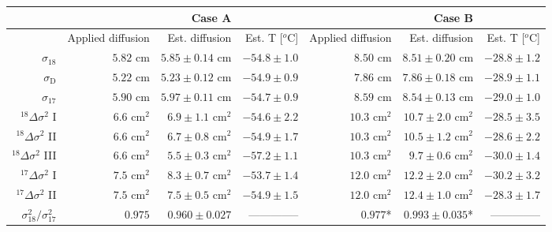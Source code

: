 \documentclass[11pt, draftcls, onecolumn]{IEEEtran} %
\numberwithin{equation}{section}
\numberwithin{table}{section}
\numberwithin{figure}{section}
\begin{document}
\begin{table}[]
	\center
	\begin{tabular}{r r r r r r r } 
		\toprule
		& &  Case A & &  & Case B&\\
		\midrule
		&	Applied diffusion  &	Est. diffusion & Est. T [$^o\mathrm{C}$] &	
		Applied diffusion	&	Est. diffusion 	& Est. T  [$^o\mathrm{C}$]\\
		\midrule
		$\sigma_{18}$	&	 $5.82$	 $\mathrm{cm}$&	$ 5.85\pm 0.14$ $\mathrm{cm}$	 &  $  -54.8 \pm 1.0 $ 	&	$8.50$  $\mathrm{cm}$&	$ 8.51 \pm 0.20$ $\mathrm{cm}$	& $ -28.8 \pm 1.2 $\\ 
		
		
		$\sigma_{\mathrm{D}}$&	$5.22$ $\mathrm{cm}$	&$ 5.23 \pm 0.12 $ $\mathrm{cm}$	 &	$-54.9  \pm 0.9 $ &	$ 7.86$	 $\mathrm{cm}$&	$7.86 \pm 0.18 $	$\mathrm{cm}$& 	$ -28.9\pm 1.1 $\\ 
		
		
		$\sigma_{17}$&	$5.90$ $\mathrm{cm}$	&$5.97 \pm 0.11 $ $\mathrm{cm}$	 &	$ -54.7 \pm 0.9$ &	$ 8.59$	 $\mathrm{cm}$&	$8.54 \pm 0.13 $	$\mathrm{cm}$& 	$-29.0 \pm 1.0 $\\ 	
		
		
		${}^{18}\Delta\sigma^2$  I &$ 6.6	$ $\mathrm{cm^2}$&	$ 6.9\pm 1.1 $ $\mathrm{cm^2}$	& $ -54.6 \pm 2.2$   &	$10.3$  $\mathrm{cm^2}$	&	$10.7 \pm 2.0$ $\mathrm{cm^2}$	&$ -28.5 \pm 3.5 $\\
		
		
		${}^{18}\Delta\sigma^2$  II& $6.6$ $\mathrm{cm^2}$	&	$6.7 \pm 0.8$ $\mathrm{cm^2}$	& $ -54.9 \pm 1.7$	&	$ 10.3$ $\mathrm{cm^2}$	&$10.5 \pm 1.2 $	 $\mathrm{cm^2}$& $-28.6 \pm 2.2$\\
		
		
		${}^{18}\Delta\sigma^2$  III& $6.6$ $\mathrm{cm^2}$	&	$5.5 \pm 0.3$ $\mathrm{cm^2}$		&  $-57.2  \pm 1.1$	&	$10.3$	 $\mathrm{cm^2}$&	 $9.7 \pm 0.6 $  $\mathrm{cm^2}$& $-30.0 \pm 1.4 $\\
		
		
		${}^{17}\Delta\sigma^2$  I &$ 7.5	$ $\mathrm{cm^2}$&	$ 8.3 \pm 0.7 $ $\mathrm{cm^2}$	& $-53.7  \pm 1.4$   &	$12.0$  $\mathrm{cm^2}$	&	$ 12.2\pm 2.0 $ $\mathrm{cm^2}$	&$-30.2 \pm 3.2$\\
		
		
		${}^{17}\Delta\sigma^2$  II& $7.5$ $\mathrm{cm^2}$	&	$7.5 \pm 0.5$ $\mathrm{cm^2}$	& $-54.9  \pm 1.5 $	&	$12.0$ $\mathrm{cm^2}$	&$ 12.4\pm 1.0$	 $\mathrm{cm^2}$& $-28.3 \pm 1.7 $\\
		
		
		$\sigma^2_{18}/\sigma^2_{17} $&$	0.975$& $ 0.960\pm 0.027 $ 	& --------------	&$0.977$*	& 	$0.993 \pm 0.035$* 	& -------------- \\
		

\end{tabular}
\end{table}
\end{document}

